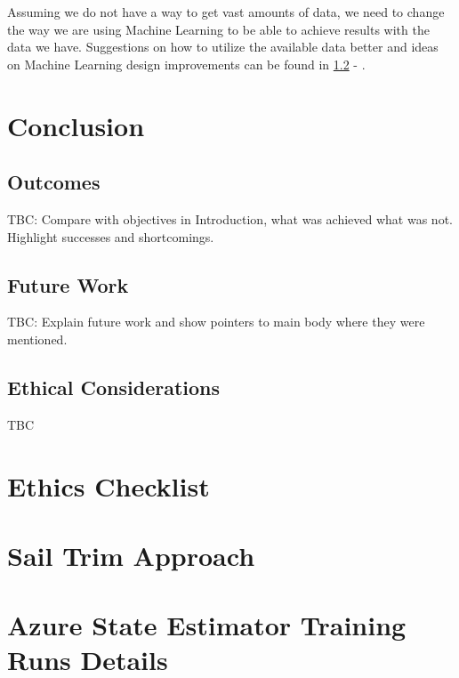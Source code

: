 \documentclass[12pt,twoside]{report}
\begin{document}
Assuming we do not have a way to get vast amounts of data, we need to change the way we are using Machine Learning to be able to achieve results with the data we have. Suggestions on how to utilize the available data better and ideas on Machine Learning design improvements can be found in \ref{sec:future-work} - .


\chapter{Conclusion}

\section{Outcomes}
TBC: Compare with objectives in Introduction, what was achieved what was not. Highlight successes and shortcomings.

\section{Future Work} \label{sec:future-work}
TBC: Explain future work and show pointers to main body where they were mentioned.

\section{Ethical Considerations}
TBC





\appendix
{}

\chapter{Ethics Checklist}


\chapter{Sail Trim Approach}


\chapter{Azure State Estimator Training Runs Details} \label{app:azure-runs}

\end{document}
